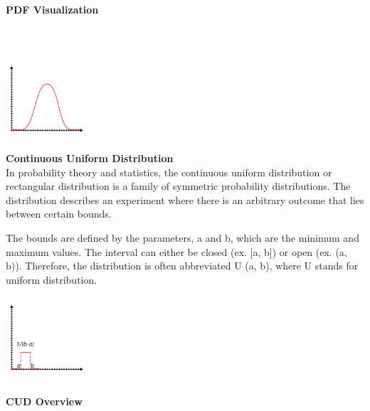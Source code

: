 \documentclass{article}
\begin{document}
\paragraph{PDF Visualization}\mbox{} \\
\mbox{} \\

\includegraphics[width=3cm, height=3cm]{pdf}

\textbf{Continuous Uniform Distribution} \\
In probability theory and statistics, the continuous uniform distribution or rectangular distribution is a family of symmetric probability distributions. The distribution describes an experiment where there is an arbitrary outcome that lies between certain bounds. 

The bounds are defined by the parameters, a and b, which are the minimum and maximum values. The interval can either be closed (ex. [a, b]) or open (ex. (a, b)).
Therefore, the distribution is often abbreviated U (a, b), where U stands for uniform distribution.

\includegraphics[width=3cm, height=3cm]{cud}

\paragraph{CUD Overview}\mbox{} \\
\end{document}
